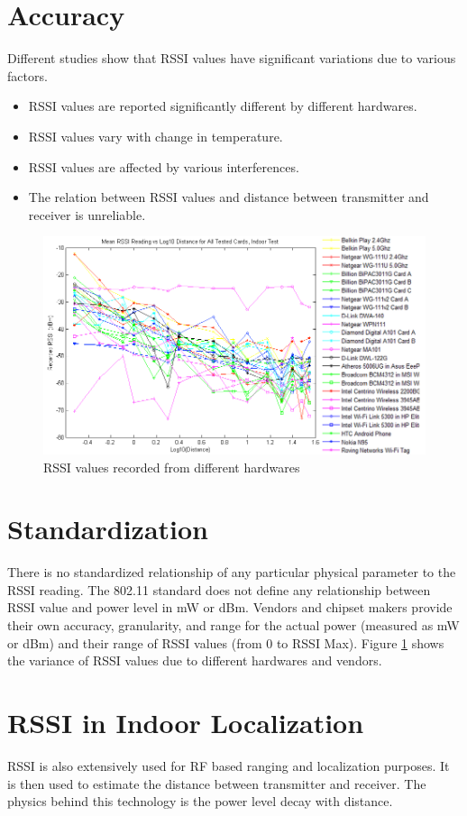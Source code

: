 \documentclass[11pt,a4paper,headinclude,footinclude,chapterprefix=on]{scrreprt}
\begin{document}
\section{Accuracy} Different studies show that RSSI values have significant variations due to various factors. 
\begin{itemize}
	\item RSSI values are reported significantly different by different hardwares. 
	\item RSSI values vary with change in temperature. 
	\item RSSI values are affected by various interferences. 
	\item The relation between RSSI values and distance between transmitter and receiver is unreliable. 
\end{itemize}
\begin{figure}
	[!h] \centering 
	\includegraphics[width=13cm]{Images/rssi_vendor1.png} \caption{RSSI values recorded from different hardwares} \label{fig:rssi_vendors} 
\end{figure}

\section{Standardization} There is no standardized relationship of any particular physical parameter to the RSSI reading. The 802.11 standard does not define any relationship between RSSI value and power level in mW or dBm. Vendors and chipset makers provide their own accuracy, granularity, and range for the actual power (measured as mW or dBm) and their range of RSSI values (from 0 to RSSI Max). Figure \ref{fig:rssi_vendors} shows the variance of RSSI values due to different hardwares and vendors.

\section{RSSI in Indoor Localization} RSSI is also extensively used for RF based ranging and localization purposes. It is then used to estimate the distance between transmitter and receiver. The physics behind this technology is the power level decay with distance. 
\end{document}
